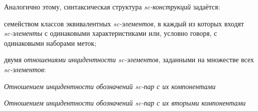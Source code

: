 Аналогично этому, синтаксическая структура \textit{sc-конструкций} задаётся:
\begin{textitemize}
	\item семейством классов  эквивалентных \textit{sc-элементов}, в каждый из которых входят \textit{sc-элементы} с одинаковыми  характеристиками или, условно говоря, с одинаковыми наборами  меток;
	\item двумя  \textit{отношениями инцидентности sc-элементов}, заданными на множестве всех \textit{sc-элементов}:
	\begin{textitemize}
		\item \textit{Отношением инцидентности обозначений sc-пар с их компонентами}
		\item \textit{Отношением инцидентности обозначений  sc-пар с их вторыми компонентами}\\
	\end{textitemize}
\end{textitemize}

